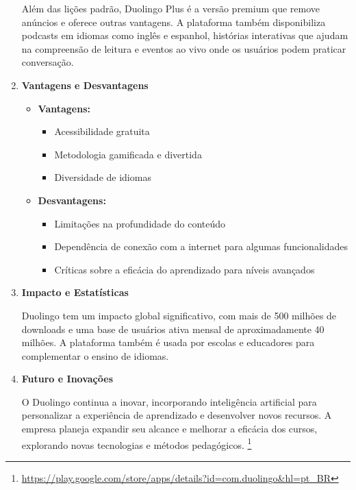 \begin{enumerate}
    Além das lições padrão, Duolingo Plus é a versão premium que remove anúncios e oferece outras vantagens. A plataforma também disponibiliza podcasts em idiomas como inglês e espanhol, histórias interativas que ajudam na compreensão de leitura e eventos ao vivo onde os usuários podem praticar conversação.

    \item \textbf{Vantagens e Desvantagens}
    
    \begin{itemize}
        \item \textbf{Vantagens:}
        \begin{itemize}
            \item Acessibilidade gratuita
            \item Metodologia gamificada e divertida
            \item Diversidade de idiomas
        \end{itemize}

        \item \textbf{Desvantagens:}
        \begin{itemize}
            \item Limitações na profundidade do conteúdo
            \item Dependência de conexão com a internet para algumas funcionalidades
            \item Críticas sobre a eficácia do aprendizado para níveis avançados
        \end{itemize}
    \end{itemize}

    \item \textbf{Impacto e Estatísticas}
    
    Duolingo tem um impacto global significativo, com mais de 500 milhões de downloads e uma base de usuários ativa mensal de aproximadamente 40 milhões. A plataforma também é usada por escolas e educadores para complementar o ensino de idiomas.

    \item \textbf{Futuro e Inovações}
    
    O Duolingo continua a inovar, incorporando inteligência artificial para personalizar a experiência de aprendizado e desenvolver novos recursos. A empresa planeja expandir seu alcance e melhorar a eficácia dos cursos, explorando novas tecnologias e métodos pedagógicos.
    \footnote{\url{https://play.google.com/store/apps/details?id=com.duolingo&hl=pt_BR}}
\end{enumerate}
   
